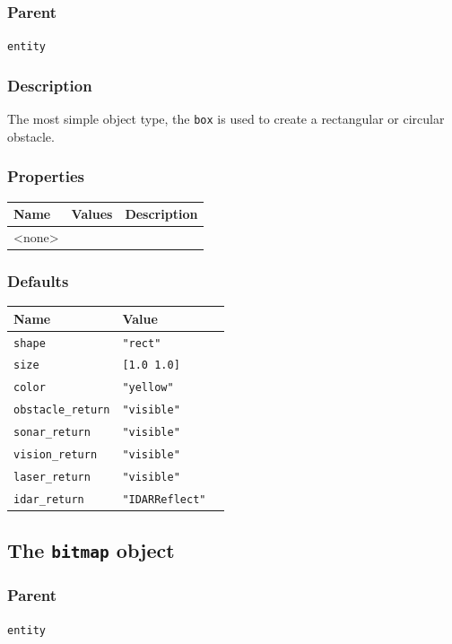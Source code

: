 \documentclass[11pt,twoside]{report}
\begin{document}
\subsubsection*{Parent}
{\tt entity}

\subsubsection*{Description}
The most simple object type, the \verb'box' is used to create a
rectangular or circular obstacle.

\subsubsection*{Properties}
\begin{tabularx}{\columnwidth}{llX}
\hline
Name & Values & Description \\
\hline
<none>\\
\hline
\end{tabularx}


\subsubsection*{Defaults}
\begin{tabularx}{\columnwidth}{llX}
\hline
Name & Value\\
\hline
\verb'shape' & \verb'"rect"'\\
\verb'size' & \verb'[1.0 1.0]'\\
\verb'color' & \verb'"yellow"'\\
\verb'obstacle_return' & \verb'"visible"'\\
\verb'sonar_return' & \verb'"visible"'\\
\verb'vision_return' & \verb'"visible"'\\
\verb'laser_return' & \verb'"visible"'\\
\verb'idar_return' & \verb'"IDARReflect"'\\
\hline
\end{tabularx}

\newpage
\subsection{The {\tt bitmap} object}

\subsubsection*{Parent}
{\tt entity}
\end{document}
